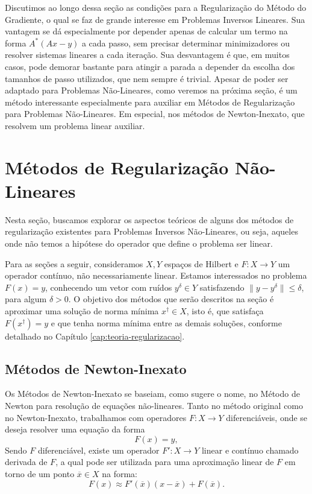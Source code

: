 Discutimos ao longo dessa seção as condições para a Regularização do Método do Gradiente, o qual se faz de grande interesse em Problemas Inversos Lineares. Sua vantagem se dá especialmente por depender apenas de calcular um termo na forma $A^*(Ax-y)$ a cada passo, sem precisar determinar minimizadores ou resolver sistemas lineares a cada iteração. Sua desvantagem é que, em muitos casos, pode demorar bastante para atingir a parada a depender da escolha dos tamanhos de passo utilizados, que nem sempre é trivial. Apesar de poder ser adaptado para Problemas Não-Lineares, como veremos na próxima seção, é um método interessante especialmente para auxiliar em Métodos de Regularização para Problemas Não-Lineares. Em especial, nos métodos de Newton-Inexato, que resolvem um problema linear auxiliar.

\section{Métodos de Regularização Não-Lineares}

Nesta seção, buscamos explorar os aspectos teóricos de alguns dos métodos de regularização existentes para Problemas Inversos Não-Lineares, ou seja, aqueles onde não temos a hipótese do operador que define o problema ser linear.

Para as seções a seguir, consideramos $X,Y$ espaços de Hilbert e $F:X \to Y$ um operador contínuo, não necessariamente linear. Estamos interessados no problema $F(x) = y$, conhecendo um vetor com ruídos $y^\delta\in Y$ satisfazendo $\| y-y^\delta\| \leq \delta$, para algum $\delta>0$. O objetivo dos métodos que serão descritos na seção é aproximar uma solução de norma mínima $x^\dag \in X$, isto é, que satisfaça $F(x^\dag) = y$ e que tenha norma mínima entre as demais soluções, conforme detalhado no Capítulo \ref{cap:teoria-regularizacao}.


\subsection{Métodos de Newton-Inexato}


Os Métodos de Newton-Inexato
se baseiam, como sugere o nome, no Método de Newton para resolução de equações não-lineares. Tanto no método original como no Newton-Inexato, trabalhamos com operadores $F:X \to Y$ diferenciáveis, onde se deseja resolver uma equação da forma
\[
F(x) = y,
\]
Sendo $F$ diferenciável, existe um operador $F': X \to Y$ linear e contínuo chamado derivada de $F$, a qual pode ser utilizada para uma aproximação linear de $F$ em torno de um ponto $\overline x\in X$ na forma:
\begin{equation}
    F(x) \approx F'(\overline x)(x - \overline x) + F(\overline x).
\end{equation}

